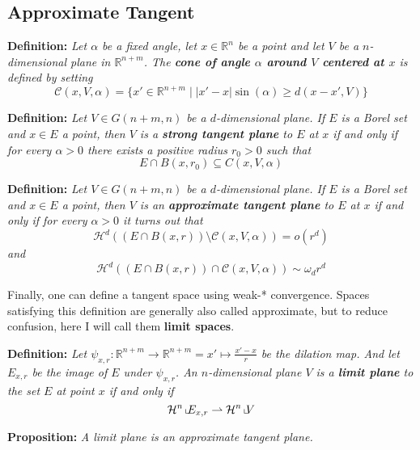 \documentclass{article}
\begin{document}
\subsection{Approximate Tangent}

\textbf{Definition:} \textit{Let $\alpha$ be a fixed angle, let $x\in\mathbb R^n$
be a point and let $V$ be a $n$-dimensional plane in $\mathbb R^{n+m}$. The \textbf{
cone of angle $\alpha$ around $V$ centered at $x$} is defined by setting
\[\mathcal C(x,V,\alpha)=\{x'\in\mathbb R^{n+m}\;|\; |x′−x|\sin(\alpha)\geq d(x−x′, V)\}\]
}

\vspace{2ex}
\textbf{Definition:} \textit{Let $V\in G(n+m, n)$ be a $d$-dimensional plane.
If $E$ is a Borel set and $x\in E$ a point, then $V$ is a \textbf{strong tangent plane}
to $E$ at $x$ if and only if for every $\alpha >0$ there exists a positive
radius $r_0 >0$ such that
\[E∩B(x, r_0)\subseteq C(x, V, \alpha)\]
}

\vspace{2ex}
\textbf{Definition:} \textit{Let $V\in G(n+m, n)$ be a $d$-dimensional plane.
If $E$ is a Borel set and $x\in E$ a point, then $V$ is an \textbf{approximate tangent
plane} to $E$ at $x$ if and only if for every $\alpha>0$ it turns out that
\[\mathcal H^d((E∩B(x,r))\setminus\mathcal C(x, V, \alpha)) = o(r^d)\]
and
\[\mathcal H^d((E∩B(x, r))∩\mathcal C(x, V, α))\sim \omega_dr^d\]
}

\vspace{2ex}
Finally, one can define a tangent space using weak-* convergence. Spaces
satisfying this definition are generally also called approximate, but to reduce
confusion, here I will call them \textbf{limit spaces}.

\vspace{1ex}
\textbf{Definition:} \textit{Let $\psi_{x,r}:\mathbb R^{n+m}\rightarrow \mathbb
R^{n+m}=x'\mapsto \frac{x'-x}{r}$ be the dilation map. And let $E_{x,r}$ be the
image of $E$ under $\psi_{x,r}$. An $n$-dimensional plane $V$ is a
\textbf{limit plane} to the set $E$ at point $x$ if and only if
\[\mathcal H^n\,\llcorner\hspace{-1mm}E_{x,r}\rightharpoonup\mathcal H^n\,\llcorner\hspace{-1mm}V\]}

\vspace{2ex}
\textbf{Proposition:} \textit{A limit plane is an approximate tangent plane.}
\end{document}
